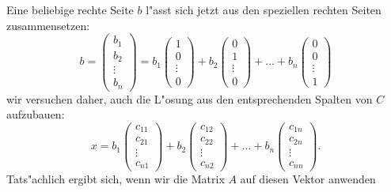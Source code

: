 Eine beliebige rechte Seite $b$ l"asst sich jetzt aus den speziellen rechten
Seiten zusammensetzen:
\[
b=\begin{pmatrix}b_1\\b_2\\\vdots\\b_n\end{pmatrix}
=
b_1\begin{pmatrix}1\\0\\\vdots\\0\end{pmatrix}
+
b_2\begin{pmatrix}0\\1\\\vdots\\0\end{pmatrix}
+\dots+
b_n\begin{pmatrix}0\\0\\\vdots\\1\end{pmatrix}
\]
wir versuchen daher, auch die L"osung aus den entsprechenden Spalten von $C$
aufzubauen:
\begin{equation}
x
=
b_1\begin{pmatrix}c_{11}\\c_{21}\\\vdots\\c_{n1}\end{pmatrix}
+
b_2\begin{pmatrix}c_{12}\\c_{22}\\\vdots\\c_{n2}\end{pmatrix}
+\dots+
b_n\begin{pmatrix}c_{1n}\\c_{2n}\\\vdots\\c_{nn}\end{pmatrix}.
\label{zusammensetzen}
\end{equation}
Tats"achlich ergibt sich, wenn wir die Matrix $A$ auf diesen Vektor
anwenden
